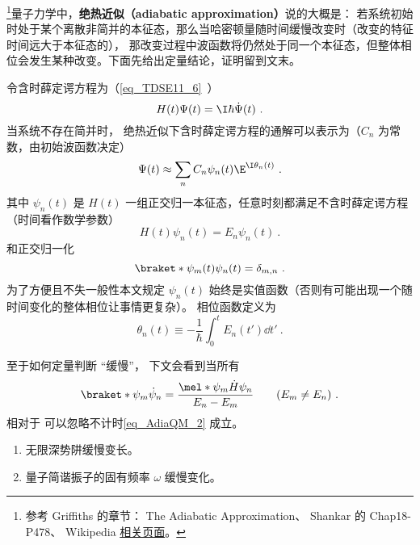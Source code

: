 
\begin{issues}
\issueTODO
\end{issues}


\footnote{参考 Griffiths\cite{GriffE} 的章节： The Adiabatic Approximation、 Shankar\cite{Shankar} 的 Chap18-P478、 Wikipedia \href{https://en.wikipedia.org/wiki/Adiabatic_theorem}{相关页面}。}量子力学中，\textbf{绝热近似（adiabatic approximation）}说的大概是： 若系统初始时处于某个离散非简并的本征态，那么当哈密顿量随时间缓慢改变时（改变的特征时间远大于本征态的）， 那改变过程中波函数将仍然处于同一个本征态，但整体相位会发生某种改变。下面先给出定量结论，证明留到文末。

令含时薛定谔方程为（\autoref{eq_TDSE11_6}~）
\begin{equation}\label{eq_AdiaQM_13}
H(t)\Psi(t) = \I\hbar\dot\Psi(t)~.
\end{equation}
当系统不存在简并时， 绝热近似下含时薛定谔方程的通解可以表示为（$C_n$ 为常数，由初始波函数决定）
\begin{equation}\label{eq_AdiaQM_2}
\Psi(t) \approx \sum_n C_n \psi_n(t) \E^{\I\theta_n(t)}~.
\end{equation}
其中 $\psi_n(t)$ 是 $H(t)$ 一组正交归一本征态，任意时刻都满足不含时薛定谔方程（时间看作数学参数）
\begin{equation}\label{eq_AdiaQM_3}
H(t)\psi_n(t) = E_n\psi_n(t)~.
\end{equation}
和正交归一化
\begin{equation}\label{eq_AdiaQM_6}
\braket*{\psi_m(t)}{\psi_n(t)} = \delta_{m,n}~.
\end{equation}
为了方便且不失一般性本文规定 $\psi_n(t)$ 始终是实值函数（否则有可能出现一个随时间变化的整体相位让事情更复杂）。 相位函数定义为
\begin{equation}\label{eq_AdiaQM_8}
\theta_n(t) \equiv -\frac{1}{\hbar} \int_0^t E_n(t')\dd{t'}~.
\end{equation}

至于如何定量判断 “缓慢”， 下文会看到当所有
\begin{equation}\label{eq_AdiaQM_11}
\braket*{\psi_m}{\dot\psi_n} = \frac{\mel*{\psi_m}{\dot H}{\psi_n}}{E_n-E_m} \qquad (E_m\ne E_n)~.
\end{equation}
相对于 可以忽略不计时\autoref{eq_AdiaQM_2} 成立。

\begin{example}{}
\begin{enumerate}
\item 无限深势阱缓慢变长。
\item 量子简谐振子的固有频率 $\omega$ 缓慢变化。
\end{enumerate}
\end{example}

